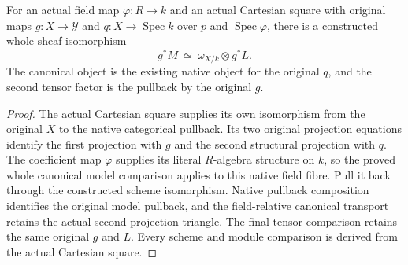 \begin{theorem}
\label{thm:kn-arithmetic-canonical-prescribed-field-square}
\leanok
{}
For an actual field map $\varphi:R\to k$ and an actual Cartesian square
with original maps $g:X\to\mathcal Y$ and $q:X\to\operatorname{Spec}k$ over
$p$ and $\operatorname{Spec}\varphi$, there is a constructed whole-sheaf
isomorphism
\[
  g^*M\ \simeq\ \omega_{X/k}\otimes g^*L.
\]
The canonical object is the existing native object for the original $q$,
and the second tensor factor is the pullback by the original $g$.
\end{theorem}
\begin{proof}
The actual Cartesian square supplies its own isomorphism from the original
$X$ to the native categorical pullback.  Its two original projection
equations identify the first projection with $g$ and the second structural
projection with $q$.  The coefficient map $\varphi$ supplies its literal
$R$-algebra structure on $k$, so the proved whole canonical model comparison
applies to this native field fibre.  Pull it back through the constructed
scheme isomorphism.  Native pullback composition identifies the original
model pullback, and the field-relative canonical transport retains the
actual second-projection triangle.  The final tensor comparison retains
the same original $g$ and $L$.  Every scheme and module comparison is
derived from the actual Cartesian square.
\end{proof}

